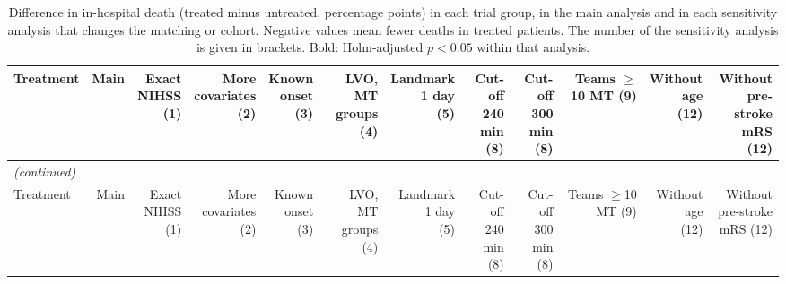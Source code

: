 \clearpage
\begin{landscape}
{\scriptsize
\setlength{\tabcolsep}{3pt}
\begin{longtable}{p{4.9cm}rrrrrrrrrrr}
\caption{Difference in in-hospital death (treated minus untreated, percentage points) in each trial group, in the main analysis and in each sensitivity analysis that changes the matching or cohort. Negative values mean fewer deaths in treated patients. The number of the sensitivity analysis is given in brackets. Bold: Holm-adjusted $p < 0.05$ within that analysis.}\label{tab:supp_sens_all_death}\\
\toprule
Treatment & Main & \makecell{Exact\\NIHSS\\(1)} & \makecell{More\\covariates\\(2)} & \makecell{Known\\onset\\(3)} & \makecell{LVO,\\MT groups\\(4)} & \makecell{Landmark\\1 day\\(5)} & \makecell{Cut-off\\240 min\\(8)} & \makecell{Cut-off\\300 min\\(8)} & \makecell{Teams\\$\ge$10 MT\\(9)} & \makecell{Without\\age\\(12)} & \makecell{Without\\pre-stroke\\mRS (12)} \\
\midrule
\endfirsthead
\multicolumn{12}{l}{\textit{(continued)}}\\
\toprule
Treatment & Main & \makecell{Exact\\NIHSS\\(1)} & \makecell{More\\covariates\\(2)} & \makecell{Known\\onset\\(3)} & \makecell{LVO,\\MT groups\\(4)} & \makecell{Landmark\\1 day\\(5)} & \makecell{Cut-off\\240 min\\(8)} & \makecell{Cut-off\\300 min\\(8)} & \makecell{Teams\\$\ge$10 MT\\(9)} & \makecell{Without\\age\\(12)} & \makecell{Without\\pre-stroke\\mRS (12)} \\

\end{longtable}}
\end{landscape}
